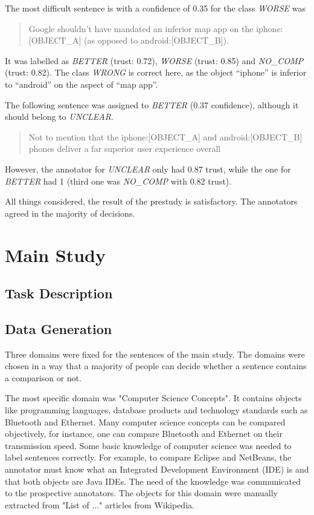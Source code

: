 The most difficult sentence is with a confidence of 0.35 for the class \emph{WORSE} was
\begin{quote}
Google shouldn't have mandated an inferior map app on the iphone:[OBJECT\_A] (as opposed to android:[OBJECT\_B]).
\end{quote}

It was labelled as \emph{BETTER} (trust: 0.72), \emph{WORSE} (trust: 0.85) and \emph{NO\_COMP} (trust: 0.82). The class \emph{WRONG} is correct here, as the object \enquote{iphone} is inferior to \enquote{android} on the aspect of \enquote{map app}.

The following sentence was assigned to \emph{BETTER} (0.37 confidence), although it should belong to \emph{UNCLEAR}.
\begin{quote}
Not to mention that the iphone:[OBJECT\_A] and android:[OBJECT\_B] phones deliver a far superior user experience overall
\end{quote}
However, the annotator for \emph{UNCLEAR} only had 0.87 trust, while the one for \emph{BETTER} had 1 (third one was \emph{NO\_COMP} with 0.82 trust).\newline

All things considered, the result of the prestudy is satisfactory. The annotators agreed in the majority of decisions. 


\newpage
\section{Main Study}
\subsection{Task Description}
\subsection{Data Generation}
Three domains were fixed for the sentences of the main study. The domains were chosen in a way that a majority of people can decide whether a sentence contains a comparison or not.

The most specific domain was "Computer Science Concepts". It contains objects like programming languages, database products and technology standards such as Bluetooth and Ethernet.  Many computer science concepts can be compared objectively, for instance, one can compare Bluetooth and Ethernet on their transmission speed. Some basic knowledge of computer science was needed to label sentences correctly. For example, to compare Eclipse and NetBeans, the annotator must know what an Integrated Development Environment (IDE) is and that both objects are Java IDEs.  The need of the knowledge was communicated to the prospective annotators. The objects for this domain were manually extracted from "List of ..." articles from Wikipedia.


